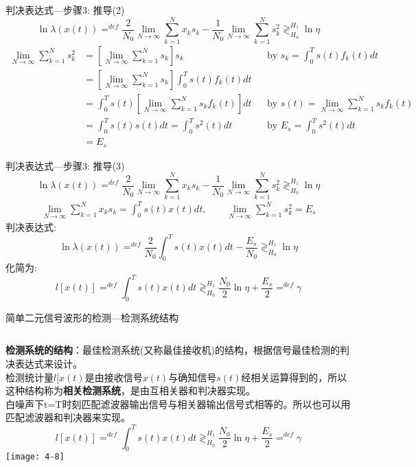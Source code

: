 \begin{frame}{判决表达式---步骤3: 推导(2)}
\[\ln\lambda(x(t))\mathop{=}^{def}
\frac{2}{N_0}\lim\limits_{N\to\infty}\sum\limits_{k=1}^{N}x_ks_k-\frac{1}{N_0}\lim\limits_{N\to\infty}\sum\limits_{k=1}^{N}s_k^2\mathop{\gtrless}_{H_0}^{H_1}\ln\eta \]
\begin{align*}
\lim\limits_{N\to\infty}\sum\limits_{k=1}^{N}s_k^2&=\left[\lim\limits_{N\to\infty}\sum\limits_{k=1}^{N}s_k\right]s_k &&\text{by }s_k=\int_{0}^{T}s(t)f_k(t)dt \\
&=\left[\lim\limits_{N\to\infty}\sum\limits_{k=1}^{N}s_k\right]\int_{0}^{T}s(t)f_k(t)dt\\
&=\int_{0}^{T}s(t)\left[\lim\limits_{N\to\infty}\sum\limits_{k=1}^{N}s_kf_k(t)\right]dt &&\text{by }s(t)=\lim\limits_{N\to\infty}\sum\limits_{k=1}^Ns_kf_k(t)\\
&=\int_{0}^{T}s(t)s(t)dt=\int_{0}^{T}s^2(t)dt &&\text{by }E_s=\int_{0}^{T}s^2(t)dt\\
&=E_s
\end{align*}
\end{frame}

\begin{frame}{判决表达式---步骤3: 推导(3)}
\[\ln\lambda(x(t))\mathop{=}^{def}
\frac{2}{N_0}\lim\limits_{N\to\infty}\sum\limits_{k=1}^{N}x_ks_k-\frac{1}{N_0}\lim\limits_{N\to\infty}\sum\limits_{k=1}^{N}s_k^2\mathop{\gtrless}_{H_0}^{H_1}\ln\eta \]
\begin{align*}
\lim\limits_{N\to\infty}\sum\limits_{k=1}^{N}x_ks_k=\int_{0}^{T}s(t)x(t)dt, \qquad \lim\limits_{N\to\infty}\sum\limits_{k=1}^{N}s_k^2=E_s
\end{align*}
判决表达式:
\[\ln\lambda(x(t))\mathop{=}^{def}\frac{2}{N_0}\int_{0}^{T}s(t)x(t)dt-\frac{E_s}{N_0}\mathop{\gtrless}_{H_0}^{H_1}\ln\eta\]
化简为:
\[l[x(t)]\mathop{=}^{def}\int_{0}^{T}s(t)x(t)dt\mathop{\gtrless}_{H_0}^{H_1}\frac{N_0}{2}\ln\eta+\frac{E_s}{2}\mathop{=}^{def}\gamma\]
\end{frame}

\begin{frame}{简单二元信号波形的检测---检测系统结构}
\begin{columns}
	\small
	\textbf{检测系统的结构}：最佳检测系统(又称最佳接收机)的结构，根据信号最佳检测的判决表达式来设计。\\
	检测统计量$l[x(t)$是由接收信号$x(t)$与确知信号$s(t)$经相关运算得到的，所以这种结构称为\textbf{相关检测系统}，是由互相关器和判决器实现。\\
	白噪声下t=T时刻匹配滤波器输出信号与相关器输出信号式相等的。所以也可以用匹配滤波器和判决器来实现。
	\[l[x(t)]\mathop{=}^{def}\int_{0}^{T}s(t)x(t)dt\mathop{\gtrless}_{H_0}^{H_1}\frac{N_0}{2}\ln\eta+\frac{E_s}{2}\mathop{=}^{def}\gamma\]
	\texttt{[image: 4-8]}
\end{columns}
\end{frame}


